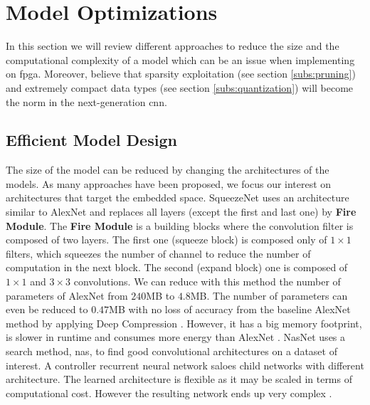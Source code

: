\section{Model Optimizations} \label{sec:mdopti}
 In this section we will review different approaches to reduce the size and the computational complexity of a model which can be an issue when implementing on \acrshort{fpga}. Moreover, \textcite{nurvitadhi_can_2017} believe that sparsity exploitation (see section \ref{subs:pruning}) and extremely compact data types (see section \ref{subs:quantization}) will become the norm in the next-generation \acrshort{cnn}.
\subsection{Efficient Model Design}
The size of the model can be reduced by changing the architectures of the models. As many approaches have been proposed, we focus our interest on architectures that target the embedded space. \newline \newline
%
SqueezeNet \cite{iandola_squeezenet_2016} uses an architecture similar to AlexNet and replaces all layers (except the first and last one) by \textbf{Fire Module}. The \textbf{Fire Module} is a building blocks where the convolution filter is composed of two layers. The first one (squeeze block) is composed only of $1 \times 1$ filters, which squeezes the number of channel to reduce the number of computation in the next block. The second (expand block) one is composed of $1 \times 1$ and $3 \times 3$ convolutions. We can reduce with this method the number of parameters of AlexNet from $240$MB to $4.8$MB. The number of parameters can even be reduced to $0.47$MB with no loss of accuracy from the baseline AlexNet method by applying Deep Compression \cite{han_deep_2016}. However, it has a big memory footprint, is slower in runtime and consumes more energy than AlexNet \cite{sze_efficient_2017}.\newline \newline
%
NasNet \cite{zoph_learning_2018} uses a search method, \acrfull{nas}, to find good convolutional architectures on a dataset of interest. A controller recurrent neural network saloes child networks with different architecture. The learned architecture is flexible as it may be scaled in terms of computational cost. However the resulting network ends up very complex \cite{sandler_mobilenetv2_2019}.\newline \newline
